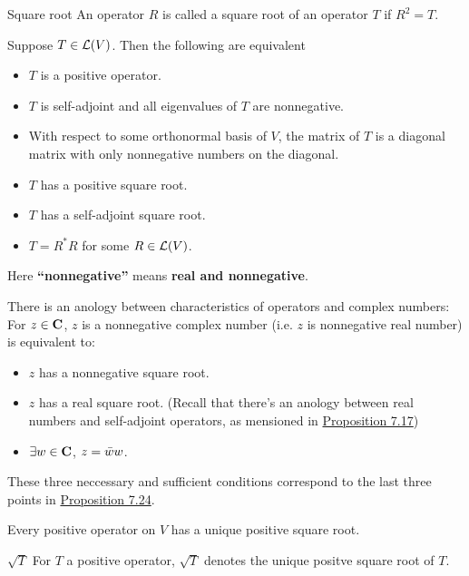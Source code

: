 \documentclass[12pt,a4paper]{article}
\begin{document}
    \begin{defi}{Square root}
        An operator $R$ is called a square root of an operator $T$ if $R^2=T$.
    \end{defi}
    \begin{prop}\label{7.24}
        Suppose $T\in\mathcal{L}(V)$. Then the following are equivalent
        \begin{itemize}
            \item $T$ is a positive operator.
            \item $T$ is self-adjoint and all eigenvalues of $T$ are nonnegative.
            \item With respect to some orthonormal basis of $V$, the matrix of $T$ is a diagonal matrix with only nonnegative numbers on the diagonal.
            \item $T$ has a positive square root.   
            \item $T$ has a self-adjoint square root.
            \item $T=R^*R$ for some $R\in\mathcal{L}(V)$.
        \end{itemize}
    \end{prop}
    \begin{remark}
        Here \textbf{“nonnegative”} means \textbf{real and nonnegative}.
    \end{remark}
    \begin{remark}
        There is an anology between characteristics of operators and complex numbers: For $z\in\mathbf{C}$, $z$ is a nonnegative complex number (i.e. $z$ is nonnegative real number) is equivalent to:
        \begin{itemize}
            \item $z$ has a nonnegative square root.
            \item $z$ has a real square root. (Recall that there's an anology between real numbers and self-adjoint operators, as mensioned in \hyperref[7.17]{Proposition 7.17})
            \item $\exists w\in\mathbf{C}$, $z=\Bar{w}w$.
        \end{itemize}
        These three neccessary and sufficient conditions correspond to the last three points in \hyperref[7.24]{Proposition 7.24}.
    \end{remark}
    \hfill

    \begin{prop}
        Every positive operator on $V$ has a unique positive square root.
    \end{prop}
    \begin{notation}{$\sqrt{T}$}
        For $T$ a positive operator, $\sqrt{T}$ denotes the unique positve square root of $T$.
    \end{notation}
\end{document}
